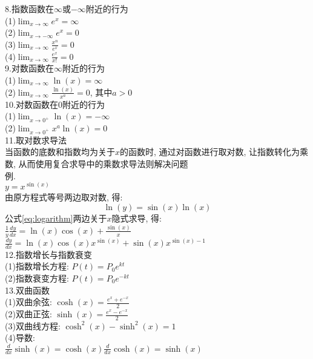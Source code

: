 8.指数函数在$\infty$或$-\infty$附近的行为\\[1ex]
(1)\quad$\displaystyle\lim_{x\to\infty}e^x=\infty$\\[1ex]
(2)\quad$\displaystyle\lim_{x\to -\infty}e^x=0$\\[1ex]
(3)\quad$\displaystyle\lim_{x\to\infty}\frac{x^n}{e^x}=0$\\[1ex]
(4)\quad$\displaystyle\lim_{x\to\infty}\frac{e^x}{x!}=0$\\[1ex]

9.对数函数在$\infty$附近的行为\\[1ex]
(1)\quad$\displaystyle\lim_{x\to\infty}\ln(x)=\infty$\\[1ex]
(2)\quad$\displaystyle\lim_{x\to\infty}\frac{\ln(x)}{x^a}=0$, 其中$a>0$\\[1ex]

10.对数函数在0附近的行为\\[1ex]
(1)\quad$\displaystyle\lim_{x\to 0^+}\ln(x)=-\infty$\\[1ex]
(2)\quad$\displaystyle\lim_{x\to 0^+}x^a\ln(x)=0$\\[1ex]

11.取对数求导法\\
当函数的底数和指数均为关于$x$的函数时, 通过对函数进行取对数, 让指数转化为乘数, 从而使用复合求导中的乘数求导法则解决问题\\
例.\\[1ex]
$\displaystyle y=x^{\sin(x)}$\\[1ex]
由原方程式等号两边取对数, 得:\\
\begin{equation}
\ln(y)=\sin(x)\ln(x)\label{eq:logarithm}
\end{equation}
公式\eqref{eq:logarithm}两边关于$x$隐式求导, 得:\\[1ex]
$\displaystyle\frac{1}{y}\frac{dy}{dx}=\ln(x)\cos(x)+\frac{\sin(x)}{x}$\\[1ex]
$\displaystyle\frac{dy}{dx}=\ln(x)\cos(x)x^{\sin(x)}+\sin(x)x^{\sin(x)-1}$\\[1ex]

12.指数增长与指数衰变\\
(1)指数增长方程: $P(t)=P_0e^{kt}$\\
(2)指数衰变方程: $P(t)=P_0e^{-kt}$\\

13.双曲函数\\[1ex]
(1)双曲余弦: $\displaystyle\cosh(x)=\frac{e^x+e^{-x}}{2}$\\[1ex]
(2)双曲正弦: $\displaystyle\sinh(x)=\frac{e^x-e^{-x}}{2}$\\[1ex]
(3)双曲线方程: $\cosh^2(x)-\sinh^2(x)=1$\\[1ex]
(4)导数:\\[1ex]
$\displaystyle\frac{d}{dx}\sinh(x)=\cosh(x)$\qquad$\displaystyle\frac{d}{dx}\cosh(x)=\sinh(x)$\\[1ex]
